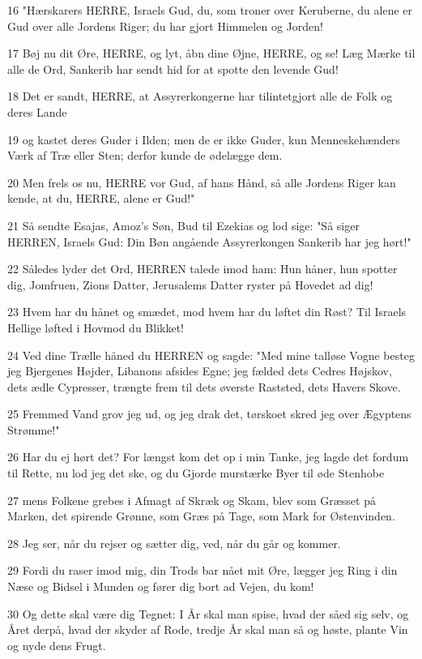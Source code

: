\par 16 "Hærskarers HERRE, Israels Gud, du, som troner over Keruberne, du alene er Gud over alle Jordens Riger; du har gjort Himmelen og Jorden!
\par 17 Bøj nu dit Øre, HERRE, og lyt, åbn dine Øjne, HERRE, og se! Læg Mærke til alle de Ord, Sankerib har sendt hid for at spotte den levende Gud!
\par 18 Det er sandt, HERRE, at Assyrerkongerne har tilintetgjort alle de Folk og deres Lande
\par 19 og kastet deres Guder i Ilden; men de er ikke Guder, kun Menneskehænders Værk af Træ eller Sten; derfor kunde de ødelægge dem.
\par 20 Men frels os nu, HERRE vor Gud, af hans Hånd, så alle Jordens Riger kan kende, at du, HERRE, alene er Gud!"
\par 21 Så sendte Esajas, Amoz's Søn, Bud til Ezekias og lod sige: "Så siger HERREN, Israels Gud: Din Bøn angående Assyrerkongen Sankerib har jeg hørt!"
\par 22 Således lyder det Ord, HERREN talede imod ham: Hun håner, hun spotter dig, Jomfruen, Zions Datter, Jerusalems Datter ryster på Hovedet ad dig!
\par 23 Hvem har du hånet og smædet, mod hvem har du løftet din Røst? Til Israels Hellige løfted i Hovmod du Blikket!
\par 24 Ved dine Trælle håned du HERREN og sagde: "Med mine talløse Vogne besteg jeg Bjergenes Højder, Libanons afsides Egne; jeg fælded dets Cedres Højskov, dets ædle Cypresser, trængte frem til dets øverste Raststed, dets Havers Skove.
\par 25 Fremmed Vand grov jeg ud, og jeg drak det, tørskoet skred jeg over Ægyptens Strømme!"
\par 26 Har du ej hørt det? For længst kom det op i min Tanke, jeg lagde det fordum til Rette, nu lod jeg det ske, og du Gjorde murstærke Byer til øde Stenhobe
\par 27 mens Folkene grebes i Afmagt af Skræk og Skam, blev som Græsset på Marken, det spirende Grønne, som Græs på Tage, som Mark for Østenvinden.
\par 28 Jeg ser, når du rejser og sætter dig, ved, når du går og kommer.
\par 29 Fordi du raser imod mig, din Trods bar nået mit Øre, lægger jeg Ring i din Næse og Bidsel i Munden og fører dig bort ad Vejen, du kom!
\par 30 Og dette skal være dig Tegnet: I År skal man spise, hvad der såed sig selv, og Året derpå, hvad der skyder af Rode, tredje År skal man så og høste, plante Vin og nyde dens Frugt.
